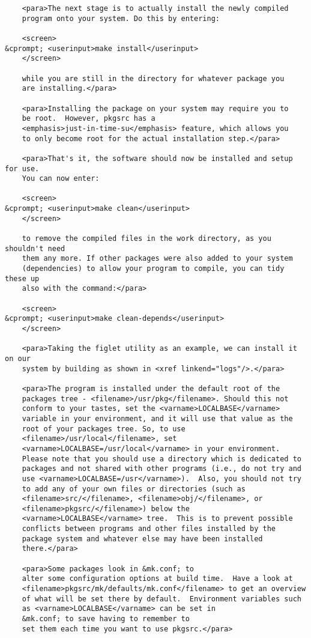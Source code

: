 \begin{verbatim}
    <para>The next stage is to actually install the newly compiled
    program onto your system. Do this by entering:

    <screen>
&cprompt; <userinput>make install</userinput>
    </screen>

    while you are still in the directory for whatever package you
    are installing.</para>

    <para>Installing the package on your system may require you to
    be root.  However, pkgsrc has a
    <emphasis>just-in-time-su</emphasis> feature, which allows you
    to only become root for the actual installation step.</para>

    <para>That's it, the software should now be installed and setup for use.
    You can now enter:

    <screen>
&cprompt; <userinput>make clean</userinput>
    </screen>

    to remove the compiled files in the work directory, as you shouldn't need
    them any more. If other packages were also added to your system
    (dependencies) to allow your program to compile, you can tidy these up
    also with the command:</para>

    <screen>
&cprompt; <userinput>make clean-depends</userinput>
    </screen>

    <para>Taking the figlet utility as an example, we can install it on our
    system by building as shown in <xref linkend="logs"/>.</para>

    <para>The program is installed under the default root of the
    packages tree - <filename>/usr/pkg</filename>. Should this not
    conform to your tastes, set the <varname>LOCALBASE</varname>
    variable in your environment, and it will use that value as the
    root of your packages tree. So, to use
    <filename>/usr/local</filename>, set
    <varname>LOCALBASE=/usr/local</varname> in your environment.
    Please note that you should use a directory which is dedicated to
    packages and not shared with other programs (i.e., do not try and
    use <varname>LOCALBASE=/usr</varname>).  Also, you should not try
    to add any of your own files or directories (such as
    <filename>src/</filename>, <filename>obj/</filename>, or
    <filename>pkgsrc/</filename>) below the
    <varname>LOCALBASE</varname> tree.  This is to prevent possible
    conflicts between programs and other files installed by the
    package system and whatever else may have been installed
    there.</para>

    <para>Some packages look in &mk.conf; to
    alter some configuration options at build time.  Have a look at
    <filename>pkgsrc/mk/defaults/mk.conf</filename> to get an overview
    of what will be set there by default.  Environment variables such
    as <varname>LOCALBASE</varname> can be set in
    &mk.conf; to save having to remember to
    set them each time you want to use pkgsrc.</para>


\end{verbatim}
